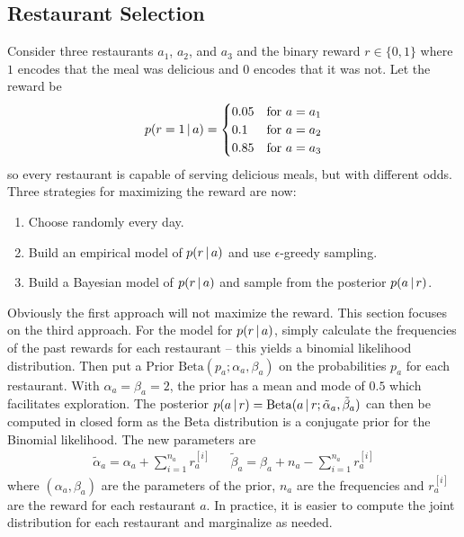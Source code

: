 		\subsection{Restaurant Selection}
			Consider three restaurants \(a_1\), \(a_2\), and \(a_3\) and the binary reward \( r \in \{ 0, 1 \} \) where \(1\) encodes that the meal was delicious and \(0\) encodes that it was not. Let the reward be
			\begin{equation*}
				p(r = 1 \,\vert\, a) =
				\begin{cases}
					0.05 & \text{for } a = a_1 \\
					0.1  & \text{for } a = a_2 \\
					0.85 & \text{for } a = a_3
				\end{cases}
			\end{equation*}
			so every restaurant is capable of serving delicious meals, but with different odds. Three strategies for maximizing the reward are now:
			\begin{enumerate}
				\item Choose randomly every day.
				\item Build an empirical model of \( p(r \,\vert\, a) \) and use \(\epsilon\)-greedy sampling.
				\item Build a Bayesian model of \( p(r \,\vert\, a) \) and sample from the posterior \( p(a \,\vert\, r) \).
			\end{enumerate}
			Obviously the first approach will not maximize the reward. This section focuses on the third approach. For the model for \( p(r \,\vert\, a) \), simply calculate the frequencies of the past rewards for each restaurant -- this yields a binomial likelihood distribution. Then put a Prior \( \mathrm{Beta}(p_a; \alpha_a, \beta_a) \) on the probabilities \( p_a \) for each restaurant. With \( \alpha_a = \beta_a = 2 \), the prior has a mean and mode of \(0.5\) which facilitates exploration. The posterior \( p(a \,\vert\, r) = \mathrm{Beta}(a \,\vert\, r; \tilde{\alpha}_a, \tilde{\beta}_a) \) can then be computed in closed form as the Beta distribution is a conjugate prior for the Binomial likelihood. The new parameters are
			\begin{align*}
				\tilde{\alpha}_a = \alpha_a + \sum_{i = 1}^{n_a} r_a^{[i]}
				 &  &
				\tilde{\beta}_a = \beta_a + n_a - \sum_{i = 1}^{n_a} r_a^{[i]}
			\end{align*}
			where \( (\alpha_a, \beta_a) \) are the parameters of the prior, \(n_a\) are the frequencies and \(r_a^{[i]}\) are the reward for each restaurant \(a\). In practice, it is easier to compute the joint distribution for each restaurant and marginalize as needed.

